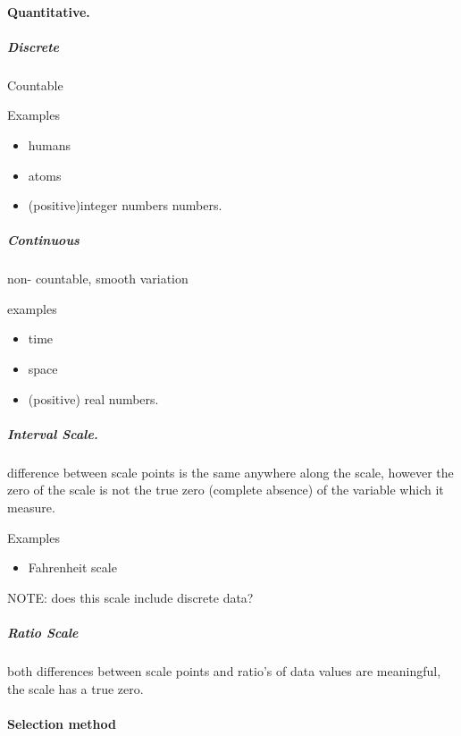\documentclass[]{article}
\providecommand{\tightlist}{%
  \setlength{\itemsep}{0pt}\setlength{\parskip}{0pt}}
\let\oldparagraph\paragraph
\renewcommand{\paragraph}[1]{\oldparagraph{#1}\mbox{}}
\let\oldsubparagraph\subparagraph
\renewcommand{\subparagraph}[1]{\oldsubparagraph{#1}\mbox{}}
\begin{document}
\hypertarget{quantitative.}{%
\paragraph{Quantitative.}\label{quantitative.}}

\hypertarget{discrete}{%
\subparagraph{Discrete}\label{discrete}}

Countable

Examples

\begin{itemize}
\tightlist
\item
  humans
\item
  atoms
\item
  (positive)integer numbers numbers.
\end{itemize}

\hypertarget{continuous}{%
\subparagraph{Continuous}\label{continuous}}

non- countable, smooth variation

examples

\begin{itemize}
\tightlist
\item
  time
\item
  space
\item
  (positive) real numbers.
\end{itemize}

\hypertarget{interval-scale.}{%
\subparagraph{Interval Scale.}\label{interval-scale.}}

difference between scale points is the same anywhere along the scale,
however the zero of the scale is not the true zero (complete absence) of
the variable which it measure.

Examples

\begin{itemize}
\tightlist
\item
  Fahrenheit scale
\end{itemize}

NOTE: does this scale include discrete data?

\hypertarget{ratio-scale}{%
\subparagraph{Ratio Scale}\label{ratio-scale}}

both differences between scale points and ratio's of data values are
meaningful, the scale has a true zero.

\hypertarget{selection-method}{%
\paragraph{Selection method}\label{selection-method}}
\end{document}
